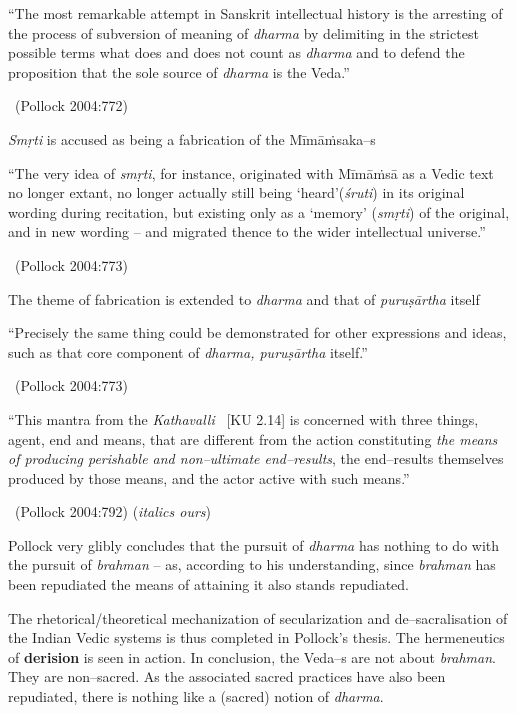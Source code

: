 \begin{myquote}
“The most remarkable attempt in Sanskrit intellectual history is the arresting of the process of subversion of meaning of \textit{dharma} by delimiting in the strictest possible terms what does and does not count as \textit{dharma} and to defend the proposition that the sole source of \textit{dharma} is the Veda.” 

~\hfill (Pollock 2004:772)
\end{myquote}

\textit{Smṛti} is accused as being a fabrication of the Mīmāṁsaka–s

\begin{myquote}
“The very idea of \textit{smṛti}, for instance, originated with Mīmāṁsā as a Vedic text no longer extant, no longer actually still being ‘heard’(\textit{śruti}) in its original wording during recitation, but existing only as a ‘memory’ (\textit{smṛti}) of the original, and in new wording – and migrated thence to the wider intellectual universe.” 

~\hfill (Pollock 2004:773)
\end{myquote}

The theme of fabrication is extended to \textit{dharma} and that of \textit{puruṣārtha} itself

\begin{myquote}
“Precisely the same thing could be demonstrated for other expressions and ideas, such as that core component of \textit{dharma, puruṣārtha} itself.” 

~\hfill (Pollock 2004:773)
\end{myquote}

\begin{myquote}
“This mantra from the \textit{Kathavalli}  [KU 2.14] is concerned with three things, agent, end and means, that are different from the action constituting \textit{the means of producing perishable and non–ultimate end–results}, the end–results themselves produced by those means, and the actor active with such means.” 

~\hfill (Pollock 2004:792) (\textit{italics ours})
\end{myquote}

Pollock very glibly concludes that the pursuit of \textit{dharma} has nothing to do with the pursuit of \textit{brahman} – as, according to his understanding, since \textit{brahman} has been repudiated the means of attaining it also stands repudiated.

The rhetorical/theoretical mechanization of secularization and de–sacralisation of the Indian Vedic systems is thus completed in Pollock’s thesis. The hermeneutics of \textbf{derision} is seen in action. In conclusion, the Veda–s are not about \textit{brahman}. They are non–sacred. As the associated sacred practices have also been repudiated, there is nothing like a (sacred) notion of \textit{dharma}.

